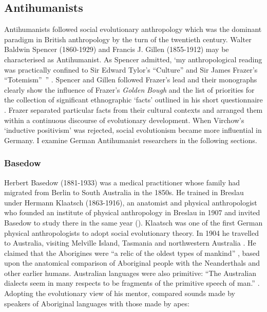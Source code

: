 \documentclass[output=paper]{langsci/langscibook}
\begin{document}
\subsection{Antihumanists}

Antihumanists followed social evolutionary anthropology which was the dominant paradigm in British anthropology by the turn of the twentieth century. Walter Baldwin Spencer (1860-1929) and Francis J. Gillen (1855-1912) may be characterised as Antihumanist. As Spencer admitted, ‘my anthropological reading was practically confined to Sir Edward Tylor’s “Culture” and Sir James Frazer’s “Totemism”~” \citep[184]{spencer_wanderings_1928}. Spencer and Gillen followed Frazer’s lead and their monographs clearly show the influence of Frazer’s \textit{Golden} \textit{Bough} and the list of priorities for the collection of significant ethnographic ‘facts’ outlined in his short questionnaire \citep[45]{urry_before_1993}. Frazer separated particular facts from their cultural contexts and arranged them within a continuous discourse of evolutionary development. When Virchow’s ‘inductive positivism’ \citep[138]{stocking_virchow_1996} was rejected, social evolutionism became more influential in Germany. I examine German Antihumanist researchers in the following sections. 

\subsubsection{Basedow}

Herbert Basedow (1881-1933) was a medical practitioner whose family had migrated from Berlin to South Australia in the 1850s. He trained in Breslau under Hermann Klaatsch (1863-1916), an anatomist and physical anthropologist who founded an institute of physical anthropology in Breslau in 1907 \citep[84]{stocking_virchow_1996} and invited Basedow to study there in the same year (\citealt[ix]{basedow_australian_1925}). Klaatsch was one of the first German physical anthropologists to adopt social evolutionary theory. In 1904 he travelled to Australia, visiting Melville Island, Tasmania and northwestern Australia \citep[423]{oetteking_hermann_1916}. He claimed that the Aborigines were “a relic of the oldest types of mankind” \citep[42]{mcgregor_imagined_1997}, based upon the anatomical comparison of Aboriginal people with the Neanderthals and other earlier humans. Australian languages were also primitive: “The Australian dialects seem in many respects to be fragments of the primitive speech of man.” \citep[38]{klaatsch_evolution_1923}. Adopting the evolutionary view of his mentor, \citet[208]{basedow_vergleichende_1908} compared sounds made by speakers of Aboriginal languages with those made by apes: 
\end{document}

